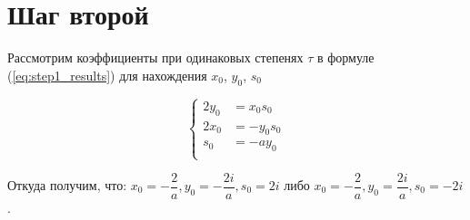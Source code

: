 \section{Шаг второй}

Рассмотрим коэффициенты при одинаковых степенях $ \tau $ в формуле (\ref{eq:step1_results}) для нахождения $ x_0 $, $ y_0 $, $ s_0 $

\begin{equation}
\label{eq:step2}
	\left\{
		\begin{aligned}
			2y_0 &= x_0 s_0 \\
            2x_0 &= -y_0 s_0 \\
            s_0 &= -ay_0 \\
		\end{aligned}
	\right.
\end{equation}

Откуда получим, что: $ x_0 = - \dfrac{2}{a}, y_0 = -\dfrac{2i}{a}, s_0 = 2i $ либо $ x_0 = - \dfrac{2}{a}, y_0 = \dfrac{2i}{a}, s_0 = -2i $.
